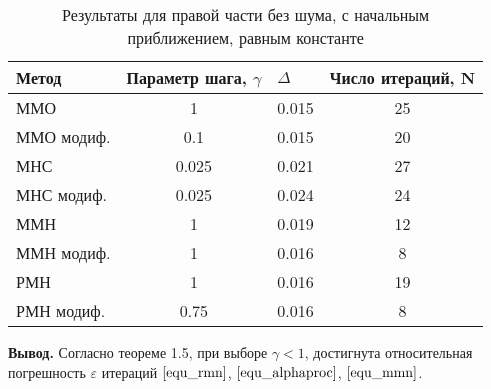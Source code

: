 \begin{table}[h]
	\centering
	\renewcommand{\arraystretch}{1.5}
	\caption{Результаты для правой части без шума, с начальным приближением, равным константе}
	\label{table1.2}
	\begin{tabular}{|l|c|c|c|}
		\hline
		\textbf{Метод}                   & \multicolumn{1}{l|}{\textbf{Параметр шага, $\gamma$}} & \multicolumn{1}{l|}{\textbf{$\Delta$}} & \multicolumn{1}{l|}{\textbf{Число итераций, N}} \\ \hline
		ММО                              & 1                                                     & 0.015                                  & 25                                              \\ \hline
		\multicolumn{1}{|r|}{ММО модиф.} & 0.1                                                   & 0.015                                  & 20                                              \\ \hline
		МНС                              & 0.025                                                 & 0.021                                  & 27                                              \\ \hline
		МНС модиф.                       & 0.025                                                 & 0.024                                  & 24                                              \\ \hline
		ММН                              & 1                                                     & 0.019                                  & 12                                              \\ \hline
		ММН модиф.                       & 1                                                     & 0.016                                  & 8                                               \\ \hline
		РМН                              & 1                                                     & 0.016                                  & 19                                              \\ \hline
		РМН модиф.                       & 0.75                                                  & 0.016                                  & 8                                               \\ \hline
	\end{tabular}
\end{table}

{\bfseries\large Вывод.} %
Согласно теореме 1.5, при выборе $\gamma<1$, достигнута относительная погрешность $\varepsilon$ итераций $\eqref{equ_rmn}$, $\eqref{equ_alphaproc}$, $\eqref{equ_mmn}$.

